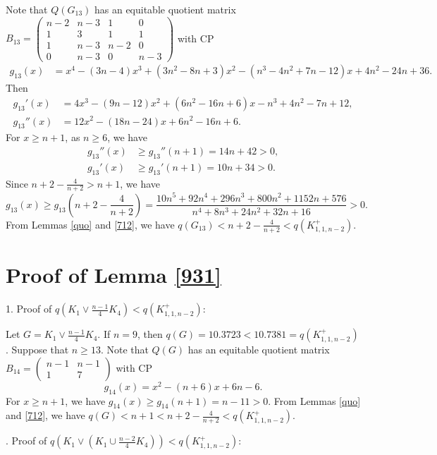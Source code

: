 \documentclass[12pt]{article}
\begin{document}
\begin{appendices}
Note that $Q(G_{13})$ has an equitable quotient matrix
$
B_{13}=
\left(\begin{smallmatrix}
n-2 & n-3 & 1&  0\\
1 &3 & 1 &1\\
1 & n-3 & n-2  & 0\\
0 &n-3  &0 &n-3
\end{smallmatrix}\right)$
with CP
\begin{align*}
g_{13}(x)&=x^4 - (3n-4)x^3 + (3n^2 - 8n + 3)x^2 -( n^3 - 4n^2 + 7n - 12)x + 4n^2 - 24n + 36.
\end{align*}
Then
\begin{align*}
g_{13}'(x)&=4x^3 - (9n-12 )x^2 + (6n^2 - 16n + 6)x - n^3 + 4n^2 - 7n + 12,\\
g_{13}''(x)&=12x^2 - (18n-24)x + 6n^2 - 16n + 6.
\end{align*}
For $x\ge n+1$, as $n\ge 6$, we have
\begin{align*}
g_{13}''(x)&\ge g_{13}''(n+1)=14n + 42>0,\\
g_{13}'(x)&\ge g_{13}'(n+1)=10n + 34>0.
\end{align*}
Since $n+2-\frac{4}{n+2}>n+1$, we have
\[
g_{13}(x)\ge g_{13}\left(n+2-\frac{4}{n+2}\right)=\frac{10n^5 + 92n^4 + 296n^3 + 800n^2 + 1152n + 576}{n^4 + 8n^3 + 24n^2 + 32n + 16}>0.
\]
From Lemmas \ref{quo} and \ref{712}, we have $q(G_{13})<n+2-\frac{4}{n+2}<q(K_{1,1,n-2}^+)$.


\section{Proof of Lemma \ref{931}}

1. Proof of $q(K_1\vee \frac{n-1}{4}K_4)<q(K_{1,1,n-2}^+)$:

Let $G=K_1\vee \frac{n-1}{4}K_4$.
If $n=9$, then $q(G)=10.3723<10.7381=q(K_{1,1,n-2}^+)$.
Suppose that $n\ge 13$. Note that $Q(G)$ has an equitable quotient matrix
$
B_{14}=
\left(\begin{smallmatrix}
n-1 &   n-1   \\
1  &  7
\end{smallmatrix}\right)$
with CP
\[
g_{14}(x)=x^2-( n + 6)x + 6n - 6.
\]
For $x\ge n+1$, we have
$g_{14}(x)\ge g_{14}(n+1)=n-11>0$.
From Lemmas \ref{quo} and \ref{712}, we have $q(G)<n+1<n+2-\frac{4}{n+2}<q(K_{1,1,n-2}^+)$.

. Proof of $q(K_1\vee (K_1\cup \frac{n-2}{4}K_4))<q(K_{1,1,n-2}^+)$:


\end{appendices}
\end{document}
